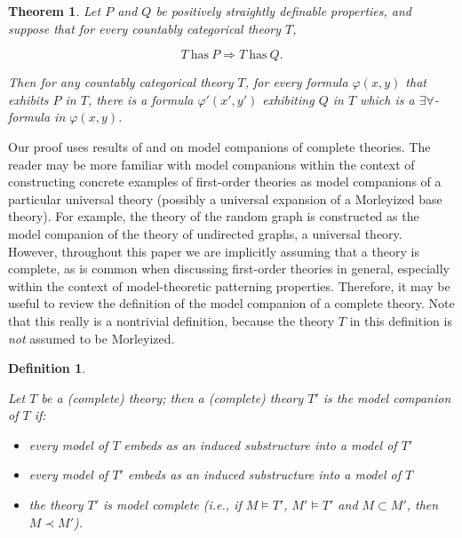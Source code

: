\documentclass[10pt,a4paper]{amsart}
\newtheorem{theorem}{Theorem}
\newtheorem{definition}{Definition}
\begin{document}
\begin{theorem} \label{theorem on implications between positively straightly definable properties in countably categorical theories}
    Let $P$ and $Q$ be positively straightly definable properties, and suppose that for every countably categorical theory $T$,

    $$T \mathrm{\: has \:} P \Rightarrow T \mathrm{\: has \:} Q.$$


    Then for any countably categorical theory $T$, for every formula $\varphi(x, y)$ that exhibits $P$ in $T$, there is a formula $\varphi'(x', y')$ exhibiting $Q$ in $T$ which is a $\exists\forall$-formula in $\varphi(x, y)$.


    
\end{theorem}



Our proof uses results of \cite{bodirsky2025taking} and \cite{saracino1973model} on model companions of complete theories. The reader may be more familiar with model companions within the context of constructing concrete examples of first-order theories as model companions of a particular universal theory (possibly a universal expansion of a Morleyized base theory). For example, the theory of the random graph is constructed as the model companion of the theory of undirected graphs, a universal theory. However, throughout this paper we are implicitly assuming that a theory is complete, as is common when discussing first-order theories in general, especially within the context of model-theoretic patterning properties. Therefore, it may be useful to review the definition of the model companion of a complete theory. Note that this really is a nontrivial definition, because the theory $T$ in this definition is \textit{not} assumed to be Morleyized. 

\begin{definition}
\label{model companion of a complete theory}


Let $T$ be a (complete) theory; then a (complete) theory $T'$ is the \textit{model companion} of $T$ if:

\begin{itemize}
    \item every model of $T$ embeds as an induced substructure into a model of $T'$
    \item every model of $T'$ embeds as an induced substructure into a model of $T$
    \item the theory $T'$ is model complete (i.e., if $M \models T'$, $M' \models T'$ and $M \subset M'$, then $M \prec M'$).
\end{itemize}




\end{definition}
\end{document}
